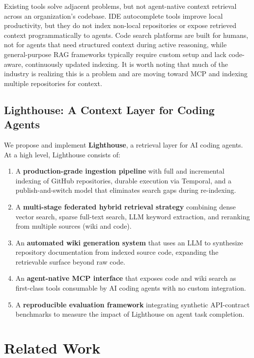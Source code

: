 \documentclass[a4paper,12pt]{article}
\begin{document}
Existing tools solve adjacent problems, but not agent-native context retrieval
across an organization's codebase.
IDE autocomplete tools improve local productivity, but they do not index
non-local repositories or expose retrieved context programmatically to agents.
Code search platforms are built for humans, not for agents that need structured
context during active reasoning, while general-purpose RAG frameworks typically
require custom setup and lack code-aware, continuously updated indexing. It is worth noting that much of the industry is realizing this is a problem and are moving toward MCP and indexing multiple repositories for context.

\subsection{Lighthouse: A Context Layer for Coding Agents}

We propose and implement \textbf{Lighthouse}, a
retrieval layer for AI coding agents. At a high level, Lighthouse consists of:

\begin{enumerate}
  \item A \textbf{production-grade ingestion pipeline} with full and incremental
    indexing of GitHub repositories, durable execution via Temporal, and a publish-and-switch model
    that eliminates search gaps during re-indexing.
  \item A \textbf{multi-stage federated hybrid retrieval strategy} combining dense vector
    search, sparse full-text search, LLM keyword extraction, and
    reranking from multiple sources (wiki and code).
  \item An \textbf{automated wiki generation system} that uses an LLM to
    synthesize repository documentation from indexed source code, expanding the
    retrievable surface beyond raw code.
  \item An \textbf{agent-native MCP interface} that exposes code and wiki search
    as first-class tools consumable by AI coding agents with no custom
    integration.
  \item A \textbf{reproducible evaluation framework} integrating synthetic API-contract benchmarks to measure the impact of Lighthouse on agent task completion.
\end{enumerate} 

\section{Related Work}
\label{sec:related}
\end{document}
